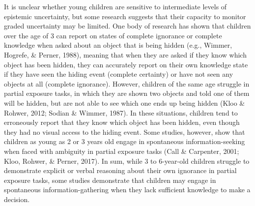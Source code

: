 \documentclass[floatsintext,man]{apa6}
\theoremstyle{definition}
\theoremstyle{definition}
\theoremstyle{definition}
\theoremstyle{remark}
\begin{document}
It is unclear whether young children are sensitive to intermediate
levels of epistemic uncertainty, but some research suggests that their
capacity to monitor graded uncertainty may be limited. One body of
research has shown that children over the age of 3 can report on states
of complete ignorance or complete knowledge when asked about an object
that is being hidden (e.g., Wimmer, Hogrefe, \& Perner, 1988), meaning
that when they are asked if they know which object has been hidden, they
can accurately report on their own knowledge state if they have seen the
hiding event (complete certainty) or have not seen any objects at all
(complete ignorance). However, children of the same age struggle in
partial exposure tasks, in which they are shown two objects and told one
of them will be hidden, but are not able to see which one ends up being
hidden (Kloo \& Rohwer, 2012; Sodian \& Wimmer, 1987). In these
situations, children tend to erroneously report that they know which
object has been hidden, even though they had no visual access to the
hiding event. Some studies, however, show that children as young as 2 or
3 years old engage in spontaneous information-seeking when faced with
ambiguity in partial exposure tasks (Call \& Carpenter, 2001; Kloo,
Rohwer, \& Perner, 2017). In sum, while 3 to 6-year-old children
struggle to demonstrate explicit or verbal reasoning about their own
ignorance in partial exposure tasks, some studies demonstrate that
children may engage in spontaneous information-gathering when they lack
sufficient knowledge to make a decision.
\end{document}
